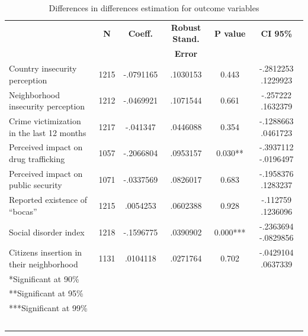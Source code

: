 \documentclass[11pt]{article}
\begin{document}
\begin{table}[H]
        \centering
        \footnotesize
        \caption{Differences in differences estimation for outcome variables}
    \label{tab:regtab}
    \begin{tabular}{lccccc}
 & \textbf{N} & \textbf{Coeff.}	&	\textbf{Robust Stand.}	&	\textbf{P value}	&	\textbf{CI 95\% } 		\\	
 &  & 	&	\textbf{Error}	&		&		\\	\hline
Country insecurity  perception	&	1215	&	-.0791165	&	.1030153	&	0.443	&	-.2812253    	.1229923	\\	
Neighborhood insecurity perception	&	1212	&	-.0469921	&	.1071544	&	0.661	&	-.257222    	.1632379	\\
Crime victimization in the last 12 months	&	1217	&	-.041347	&	.0446088	&	0.354	&	-.1288663  	 .0461723	\\	
Perceived impact on drug trafficking &	1057	&	-.2066804 	&	.0953157	&	0.030**	&	 -.3937112  	 -.0196497	\\	
Perceived impact on public security	&	1071	&	-.0337569 	&	.0826017 	&	0.683	&	-.1958376    	.1283237	\\
Reported existence of ``bocas''	&	1215	&	.0054253	&	.0602388	&	 0.928	&	-.112759 	.1236096	\\	
Social disorder index	&	1218	&	-.1596775 	&	.0390902 	&	0.000***	&	-.2363694 	-.0829856	\\	
Citizens insertion in their neighborhood	&	1131	&	.0104118	&	.0271764	&	0.702	&	-.0429104   	 .0637339	\\	\hline
*Significant at 90\%\\
**Significant at 95\%\\
***Significant at 99\% \\~\\
        \end{tabular}
        \end{table}
\end{document}
